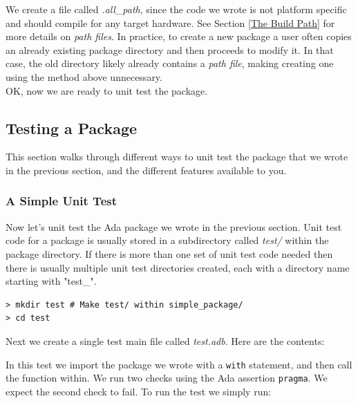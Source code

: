 We create a file called \textit{.all\_path}, since the code we wrote is not platform specific and should compile for any target hardware. See Section \ref{The Build Path} for more details on \textit{path files}. In practice, to create a new package a user often copies an already existing package directory and then proceeds to modify it. In that case, the old directory likely already contains a \textit{path file}, making creating one using the method above unnecessary. \\

OK, now we are ready to unit test the package.

\subsection{Testing a Package} \label{Testing a Package}

This section walks through different ways to unit test the package that we wrote in the previous section, and the different features available to you.

\subsubsection{A Simple Unit Test}

Now let's unit test the Ada package we wrote in the previous section. Unit test code for a package is usually stored in a subdirectory called \textit{test/} within the package directory. If there is more than one set of unit test code needed then there is usually multiple unit test directories created, each with a directory name starting with "test\_".

\vspace{5mm} %
\begin{verbatim}
> mkdir test # Make test/ within simple_package/
> cd test 
\end{verbatim}
\vspace{5mm} %

Next we create a single test main file called \textit{test.adb}. Here are the contents:


In this test we import the package we wrote with a \texttt{with} statement, and then call the function within. We run two checks using the Ada assertion \texttt{pragma}. We expect the second check to fail. To run the test we simply run:

